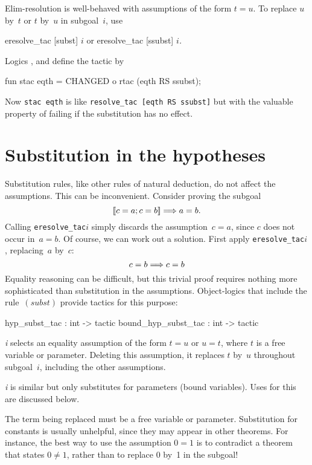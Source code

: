 Elim-resolution is well-behaved with assumptions of the form $t=u$.
To replace $u$ by~$t$ or $t$ by~$u$ in subgoal~$i$, use
\begin{ttbox} 
eresolve_tac [subst] \(i\)    {\rm or}    eresolve_tac [ssubst] \(i\){\it.}
\end{ttbox}

Logics \HOL, {\FOL} and {\ZF} define the tactic  by
\begin{ttbox} 
fun stac eqth = CHANGED o rtac (eqth RS ssubst);
\end{ttbox}
Now \texttt{stac~eqth} is like \texttt{resolve_tac [eqth RS ssubst]} but with the
valuable property of failing if the substitution has no effect.


\section{Substitution in the hypotheses}
Substitution rules, like other rules of natural deduction, do not affect
the assumptions.  This can be inconvenient.  Consider proving the subgoal
\[ \mathopen{[\![} c=a; c=b\mathclose{]\!]} \Longrightarrow a=b. \]
Calling \texttt{eresolve_tac\ts[ssubst]\ts\(i\)} simply discards the
assumption~$c=a$, since $c$ does not occur in~$a=b$.  Of course, we can
work out a solution.  First apply \texttt{eresolve_tac\ts[subst]\ts\(i\)},
replacing~$a$ by~$c$:
\[ c=b \Longrightarrow c=b \]
Equality reasoning can be difficult, but this trivial proof requires
nothing more sophisticated than substitution in the assumptions.
Object-logics that include the rule~$(subst)$ provide tactics for this
purpose:
\begin{ttbox} 
hyp_subst_tac       : int -> tactic
bound_hyp_subst_tac : int -> tactic
\end{ttbox}
\begin{ttdescription}
\item[\ttindexbold{hyp_subst_tac} {\it i}] 
  selects an equality assumption of the form $t=u$ or $u=t$, where $t$ is a
  free variable or parameter.  Deleting this assumption, it replaces $t$
  by~$u$ throughout subgoal~$i$, including the other assumptions.

\item[\ttindexbold{bound_hyp_subst_tac} {\it i}] 
  is similar but only substitutes for parameters (bound variables).
  Uses for this are discussed below.
\end{ttdescription}
The term being replaced must be a free variable or parameter.  Substitution
for constants is usually unhelpful, since they may appear in other
theorems.  For instance, the best way to use the assumption $0=1$ is to
contradict a theorem that states $0\not=1$, rather than to replace 0 by~1
in the subgoal!

